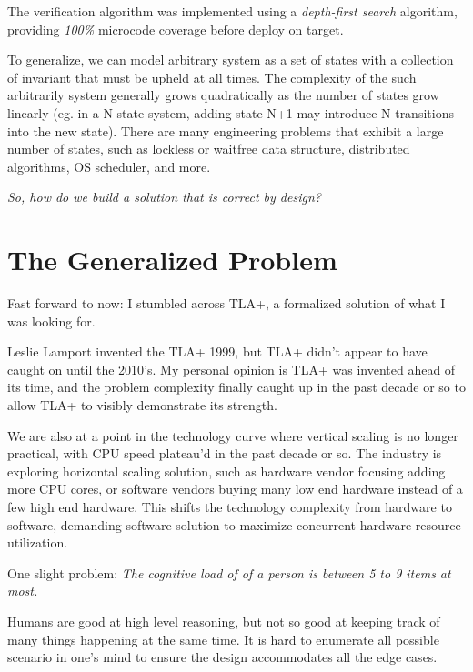 \documentclass{report}
\begin{document}
The verification algorithm was implemented using a \textit{depth-first search}
algorithm, providing \textit{100\%} microcode coverage before deploy on
target.\newline

To generalize, we can model arbitrary system as a set of states with a
collection of invariant that must be upheld at all times. The complexity of the
such arbitrarily system generally grows quadratically as the number of states
grow linearly (eg. in a N state system, adding state N+1 may introduce N
transitions into the new state). There are many engineering problems that
exhibit a large number of states, such as lockless or waitfree data structure,
distributed algorithms, OS scheduler, and more.\newline

\textit{So, how do we build a solution that is correct by design?}

\section{The Generalized Problem}

Fast forward to now: I stumbled across TLA+, a formalized solution of what I was
looking for.\newline

Leslie Lamport invented the TLA+ 1999, but TLA+ didn't appear to have caught on
until the 2010's. My personal opinion is TLA+ was invented ahead of its time,
and the problem complexity finally caught up in the past decade or so to allow
TLA+ to visibly demonstrate its strength.\newline

We are also at a point in the technology curve where vertical scaling is no
longer practical, with CPU speed plateau'd in the past decade or so. The
industry is exploring horizontal scaling solution, such as hardware vendor
focusing adding more CPU cores, or software vendors buying many low end hardware
instead of a few high end hardware. This shifts the technology complexity from
hardware to software, demanding software solution to maximize concurrent
hardware resource utilization. \newline

One slight problem: \textit{The cognitive load of of a person is between 5 to 9
items at most.}\newline

Humans are good at high level reasoning, but not so good at keeping track of
many things happening at the same time. It is hard to enumerate all possible
scenario in one's mind to ensure the design accommodates all the edge cases.
\newline
\end{document}
